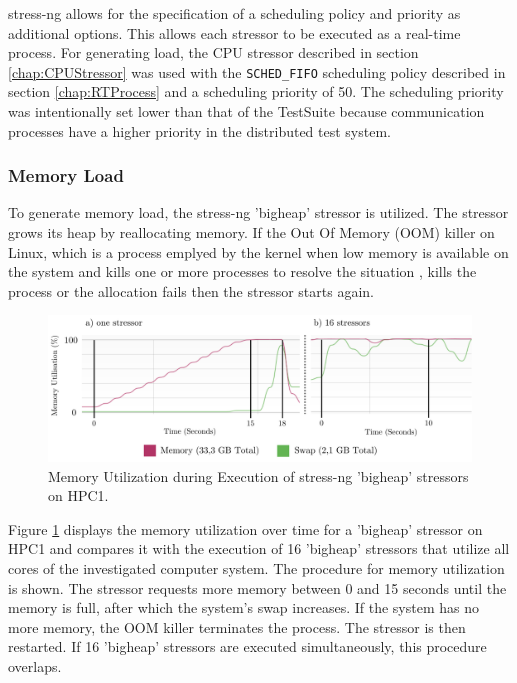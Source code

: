 stress-ng allows for the specification of a scheduling policy and priority as additional options. This allows each stressor to be executed as a real-time process. For generating load, the CPU stressor described in section \ref{chap:CPUStressor} was used with the \texttt{SCHED\_FIFO} scheduling policy described in section \ref{chap:RTProcess} and a scheduling priority of 50. The scheduling priority was intentionally set lower than that of the TestSuite because communication processes have a higher priority in the distributed test system.

\subsubsection{Memory Load} \label{chap:stressngMemeory}
To generate memory load, the stress-ng 'bigheap' stressor is utilized. The stressor grows its heap by reallocating memory. If the Out Of Memory (OOM) killer on Linux, which is a process emplyed by the kernel when low memory is available on the system and kills one or more processes to resolve the situation \cite{stress09}, kills the process or the allocation fails then the stressor starts again.

\begin{figure}[h!]
    \centering
    \includegraphics[width=1\linewidth]{figures/method/stress3.pdf}
    \caption{Memory Utilization during Execution of stress-ng 'bigheap' stressors on HPC1.}
    \label{fig:stressMEM}
\end{figure}

Figure \ref{fig:stressMEM} displays the memory utilization over time for a 'bigheap' stressor on HPC1 and compares it with the execution of 16 'bigheap' stressors that utilize all cores of the investigated computer system. The procedure for memory utilization is shown. The stressor requests more memory between 0 and 15 seconds until the memory is full, after which the system's swap increases. If the system has no more memory, the OOM killer terminates the process. The stressor is then restarted. If 16 'bigheap' stressors are executed simultaneously, this procedure overlaps.

